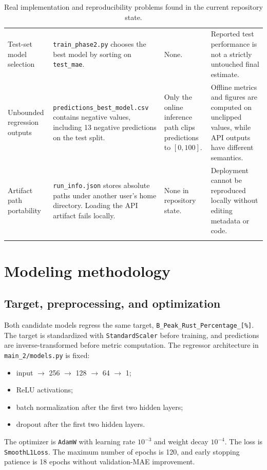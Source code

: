 \documentclass[11pt]{article}
\begin{document}
\begin{longtable}{p{} p{} p{} p{}}
Test-set model selection & \texttt{train\_phase2.py} chooses the best model by sorting on \texttt{test\_mae}. & None. & Reported test performance is not a strictly untouched final estimate. \\
Unbounded regression outputs & \texttt{predictions\_best\_model.csv} contains negative values, including 13 negative predictions on the test split. & Only the online inference path clips predictions to \([0,100]\). & Offline metrics and figures are computed on unclipped values, while API outputs have different semantics. \\
Artifact path portability & \texttt{run\_info.json} stores absolute paths under another user's home directory. Loading the API artifact fails locally. & None in repository state. & Deployment cannot be reproduced locally without editing metadata or code. \\
\bottomrule
\caption{Real implementation and reproducibility problems found in the current repository state.}
\label{tab:challenges}
\end{longtable}

\section{Modeling methodology}

\subsection{Target, preprocessing, and optimization}
Both candidate models regress the same target, \texttt{B\_Peak\_Rust\_Percentage\_[\%]}. The target is standardized with \texttt{StandardScaler} before training, and predictions are inverse-transformed before metric computation. The regressor architecture in \texttt{main\_2/models.py} is fixed:
\begin{itemize}
  \item input \(\rightarrow\) 256 \(\rightarrow\) 128 \(\rightarrow\) 64 \(\rightarrow\) 1;
  \item ReLU activations;
  \item batch normalization after the first two hidden layers;
  \item dropout after the first two hidden layers.
\end{itemize}

The optimizer is \texttt{AdamW} with learning rate \(10^{-3}\) and weight decay \(10^{-4}\). The loss is \texttt{SmoothL1Loss}. The maximum number of epochs is 120, and early stopping patience is 18 epochs without validation-MAE improvement.
\end{document}
